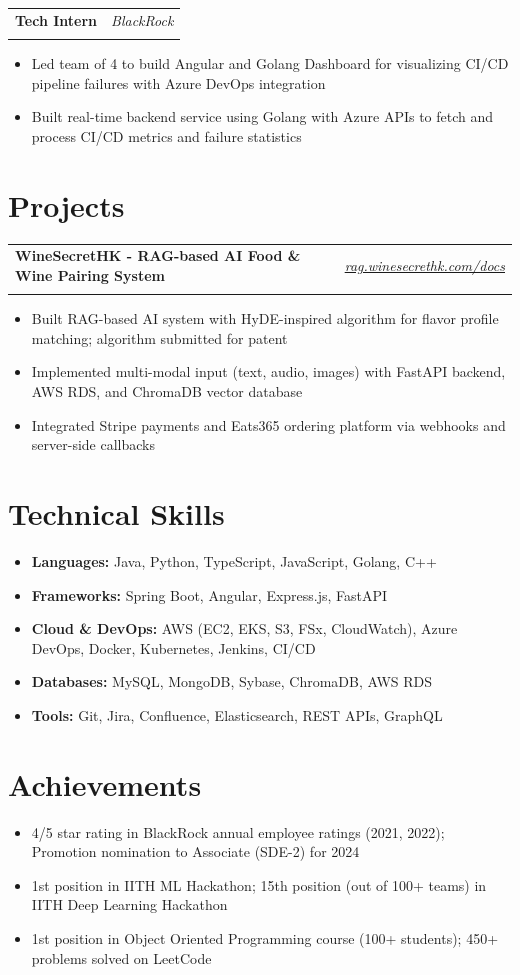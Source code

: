 \documentclass[11pt,a4paper]{article}
\makeatletter
\newcommand{\resumeItem}[1]{\item\small{#1}}
\newcommand{\resumeHeading}[4]{
  \begin{tabular*}{\textwidth}[t]{p{0.65\textwidth}@{\extracolsep{\fill}}>{\raggedleft\arraybackslash}p{0.3\textwidth}}
    \textbf{#1} & \textit{#2} \\
    & \textit{\ifstrempty{#4}{#3}{#3 \ #4}}
  \end{tabular*}
  \vspace{-4pt}
}
\makeatother
\begin{document}
\resumeHeading{Tech Intern}{BlackRock}{January 2021 - July 2021}{}
\begin{itemize}[leftmargin=*,noitemsep,topsep=0pt]
    \resumeItem{Led team of 4 to build Angular and Golang Dashboard for visualizing CI/CD pipeline failures with Azure DevOps integration}
    \resumeItem{Built real-time backend service using Golang with Azure APIs to fetch and process CI/CD metrics and failure statistics}
\end{itemize}

\section{Projects}
\resumeHeading{WineSecretHK - RAG-based AI Food \& Wine Pairing System}{\href{https://rag.winesecrethk.com/docs}{rag.winesecrethk.com/docs}}{}{}
\begin{itemize}[leftmargin=*,noitemsep,topsep=0pt]
    \resumeItem{Built RAG-based AI system with HyDE-inspired algorithm for flavor profile matching; algorithm submitted for patent}
    \resumeItem{Implemented multi-modal input (text, audio, images) with FastAPI backend, AWS RDS, and ChromaDB vector database}
    \resumeItem{Integrated Stripe payments and Eats365 ordering platform via webhooks and server-side callbacks}
\end{itemize}

\section{Technical Skills}
\begin{itemize}[leftmargin=*,noitemsep,topsep=0pt]
    \resumeItem{\textbf{Languages:} Java, Python, TypeScript, JavaScript, Golang, C++}
    \resumeItem{\textbf{Frameworks:} Spring Boot, Angular, Express.js, FastAPI}
    \resumeItem{\textbf{Cloud \& DevOps:} AWS (EC2, EKS, S3, FSx, CloudWatch), Azure DevOps, Docker, Kubernetes, Jenkins, CI/CD}
    \resumeItem{\textbf{Databases:} MySQL, MongoDB, Sybase, ChromaDB, AWS RDS}
    \resumeItem{\textbf{Tools:} Git, Jira, Confluence, Elasticsearch, REST APIs, GraphQL}
\end{itemize}

\section{Achievements}
\begin{itemize}[leftmargin=*,noitemsep,topsep=0pt]
    \resumeItem{4/5 star rating in BlackRock annual employee ratings (2021, 2022); Promotion nomination to Associate (SDE-2) for 2024}
    \resumeItem{1st position in IITH ML Hackathon; 15th position (out of 100+ teams) in IITH Deep Learning Hackathon}
    \resumeItem{1st position in Object Oriented Programming course (100+ students); 450+ problems solved on LeetCode}
\end{itemize}
\end{document}
